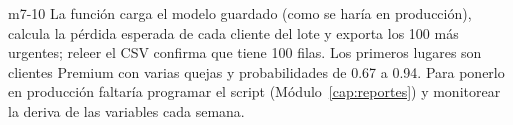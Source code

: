 \begin{solucion}{m7-10}
La función carga el modelo guardado (como se haría en producción), calcula
la pérdida esperada de cada cliente del lote y exporta los 100 más urgentes;
releer el CSV confirma que tiene 100 filas. Los primeros lugares son clientes
Premium con varias quejas y probabilidades de 0.67 a 0.94. Para ponerlo en
producción faltaría programar el script (Módulo~\ref{cap:reportes}) y
monitorear la deriva de las variables cada semana.
\end{solucion}
